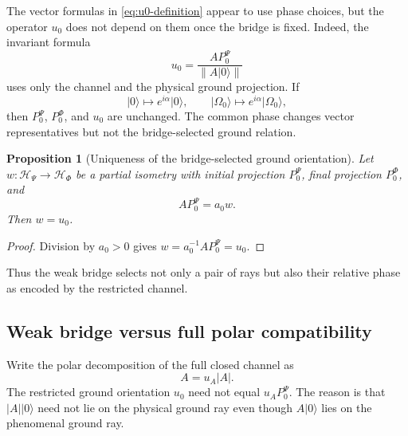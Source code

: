\documentclass[11pt,reqno]{scrartcl}
\newcommand{\scrHP}{\mathscr H_{\Psi}}
\newcommand{\scrHF}{\mathscr H_{\Phi}}
\newcommand{\PzeroP}{P_{0}^{\Psi}}
\newcommand{\PzeroF}{P_{0}^{\Phi}}
\newcommand{\polA}{u_A}
\newcommand{\absA}{|A|}
\newcommand{\uzero}{u_{0}}
\newcommand{\ket}[1]{\lvert #1\rangle}
\theoremstyle{plain}
\newtheorem{proposition}[proposition]{Proposition}
\theoremstyle{definition}
\theoremstyle{remark}
\begin{document}
The vector formulas in \eqref{eq:u0-definition} appear to use phase choices,
but the operator \(\uzero\) does not depend on them once the bridge is fixed.
Indeed, the invariant formula
\begin{equation}
  \boxed{
  \uzero=\frac{A\PzeroP}{\|A\ket0\|}}
  \label{eq:u0-invariant-formula}
\end{equation}
uses only the channel and the physical ground projection.  If
\begin{equation}
  \ket0\longmapsto e^{i\alpha}\ket0,
  \qquad
  \ket{\Omega_0}\longmapsto e^{i\alpha}\ket{\Omega_0},
\end{equation}
then \(\PzeroP\), \(\PzeroF\), and \(\uzero\) are unchanged.  The common
phase changes vector representatives but not the bridge-selected ground
relation.

\begin{proposition}[Uniqueness of the bridge-selected ground orientation]
\label{prop:u0-uniqueness}
Let \(w:\scrHP\to\scrHF\) be a partial isometry with initial projection
\(\PzeroP\), final projection \(\PzeroF\), and
\begin{equation}
  A\PzeroP=a_0 w.
\end{equation}
Then \(w=\uzero\).
\end{proposition}

\begin{proof}
Division by \(a_0>0\) gives \(w=a_0^{-1}A\PzeroP=\uzero\).
\end{proof}

Thus the weak bridge selects not only a pair of rays but also their relative
phase as encoded by the restricted channel.

\subsection{Weak bridge versus full polar compatibility}

Write the polar decomposition of the full closed channel as
\begin{equation}
  A=\polA\absA.
  \label{eq:full-A-polar}
\end{equation}
The restricted ground orientation \(\uzero\) need not equal
\(\polA\PzeroP\).  The reason is that \(\absA\ket0\) need not lie on the
physical ground ray even though \(A\ket0\) lies on the phenomenal ground
ray.
\end{document}
